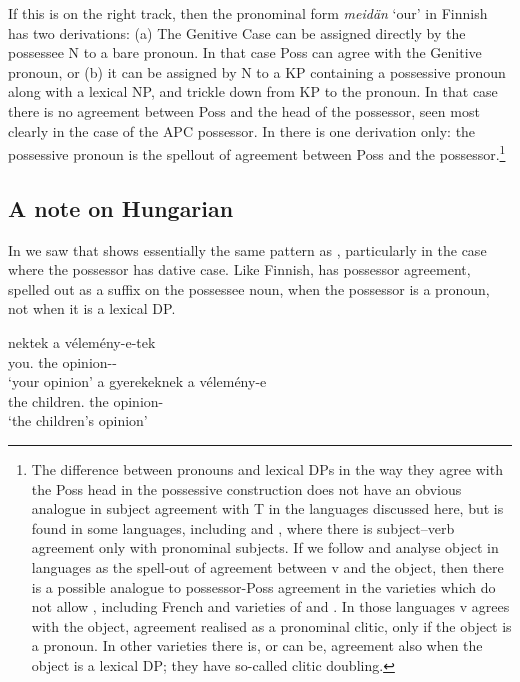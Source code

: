 \documentclass[output=paper]{langsci/langscibook}
\begin{document}
If this is on the right track, then the pronominal form \emph{meidän} `our' in
Finnish has two derivations: (a) The Genitive Case can be assigned directly by
the possessee N to a bare pronoun. In that case Poss can agree with the
Genitive pronoun, or (b) it can be assigned by N to a KP containing a
possessive pronoun along with a lexical NP, and trickle down from KP to the
pronoun. In that case there is no agreement between Poss and the head of the
possessor, seen most clearly in the case of the \gls{APC} possessor. In 
there is one derivation only: the possessive pronoun is the spellout of
agreement between Poss and the possessor.\footnote{The difference between
pronouns and lexical DPs in the way they agree with the Poss head in the
possessive construction does not have an obvious analogue in subject
agreement
with T in the languages discussed here, but is found in some languages,
including  and , where there is subject--verb
agreement only with
pronominal subjects. If we follow \citet[128--139]{Roberts2010} and analyse
object  in  languages as the spell-out of agreement between v and
the object, then there is a possible analogue to possessor-Poss agreement in
the  varieties which do not allow , including French and
varieties of  and . In those languages v agrees with the object,
agreement realised as a pronominal clitic, only if the object is a pronoun. In
other varieties there is, or can be, agreement also when the object is a
lexical DP; they have so-called clitic doubling.}

\subsection{A note on Hungarian}\label{sec:key:16.3.4}

In  we saw that  shows essentially the same pattern
as , particularly in the case where the possessor has dative case. Like
Finnish,  has possessor agreement, spelled out as a suffix on the
possessee noun, when the possessor is a pronoun, not when it is a lexical DP.

\ea\label{ex:key:16.46}
   	\ea
		\gll nektek    a    vélemény-e-tek\\
		        you.\Dat{} the opinion-\Poss-\Spl{}\\
	    \glt `your opinion'
	\ex
		\gll a    gyerekeknek    a    vélemény-e\\
			the children.\Dat{} the opinion-\Poss{}\\
		\glt `the children's opinion'
	\z
\z
\end{document}
